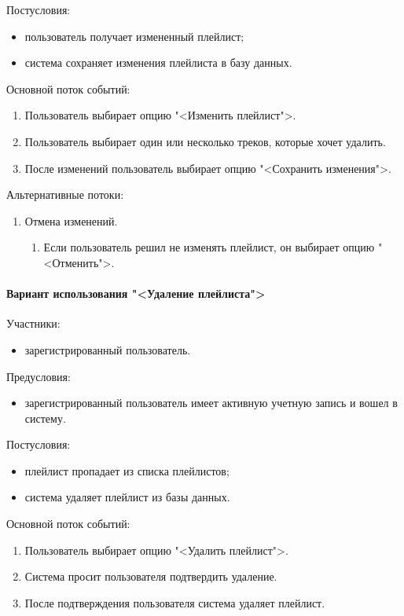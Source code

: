 Постусловия:
\begin{itemize}
	\item пользователь получает измененный плейлист;
	\item система сохраняет изменения плейлиста в базу данных.
\end{itemize}

Основной поток событий:
\begin{enumerate}
	\item Пользователь выбирает опцию "<Изменить плейлист">.
	\item Пользователь выбирает один или несколько треков, которые хочет удалить.
	\item После изменений пользователь выбирает опцию "<Сохранить изменения">.
\end{enumerate}

Альтернативные потоки:
\begin{enumerate}
	\item Отмена изменений.
	\begin{enumerate}
		\item Если пользователь решил не изменять плейлист, он выбирает опцию "<Отменить">.
	\end{enumerate}
\end{enumerate}

\paragraph{Вариант использования "<Удаление плейлиста">}

Участники:
\begin{itemize}
	\item зарегистрированный пользователь.
\end{itemize}

Предусловия:
\begin{itemize}
	\item зарегистрированный пользователь имеет активную учетную запись и вошел в систему.
\end{itemize}

Постусловия:
\begin{itemize}
	\item плейлист пропадает из списка плейлистов;
	\item система удаляет плейлист из базы данных.
\end{itemize}

Основной поток событий:
\begin{enumerate}
	\item Пользователь выбирает опцию "<Удалить плейлист">.
	\item Система просит пользователя подтвердить удаление.
	\item После подтверждения пользователя система удаляет плейлист.
\end{enumerate}

